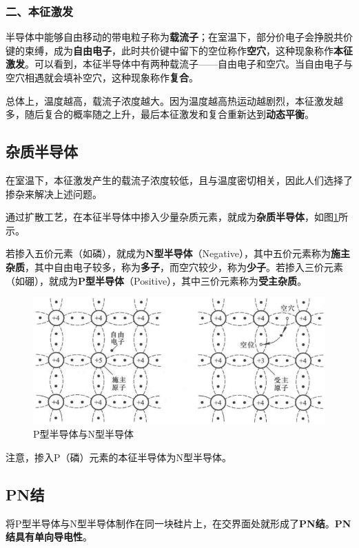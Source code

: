 \subsubsection{二、本征激发}
半导体中能够自由移动的带电粒子称为\textbf{载流子}；在室温下，部分价电子会挣脱共价键的束缚，成为\textbf{自由电子}，此时共价键中留下的空位称作\textbf{空穴}，这种现象称作\textbf{本征激发}。可以看到，本征半导体中有两种载流子——自由电子和空穴。当自由电子与空穴相遇就会填补空穴，这种现象称作\textbf{复合}。

总体上，温度越高，载流子浓度越大。因为温度越高热运动越剧烈，本征激发越多，随后复合的概率随之上升，最后本征激发和复合重新达到\textbf{动态平衡}。

\subsection{杂质半导体}
在室温下，本征激发产生的载流子浓度较低，且与温度密切相关，因此人们选择了掺杂来解决上述问题。

通过扩散工艺，在本征半导体中掺入少量杂质元素，就成为\textbf{杂质半导体}，如图\ref{P型半导体与N型半导体}所示。

若掺入五价元素（如磷），就成为\textbf{N型半导体}（Negative），其中五价元素称为\textbf{施主杂质}，其中自由电子较多，称为\textbf{多子}，而空穴较少，称为\textbf{少子}。若掺入三价元素（如硼），就成为\textbf{P型半导体}（Positive），其中三价元素称为\textbf{受主杂质}。

\begin{figure}[htb]
    \centering
    \includegraphics[width=0.8\linewidth]{pic/P型半导体与N型半导体.png}
    \caption{P型半导体与N型半导体\cite{华成英}\label{P型半导体与N型半导体}}
\end{figure}

注意，掺入P（磷）元素的本征半导体为N型半导体。

\subsection{PN结}
将P型半导体与N型半导体制作在同一块硅片上，在交界面处就形成了\textbf{PN结}。\textbf{PN结具有单向导电性}。

